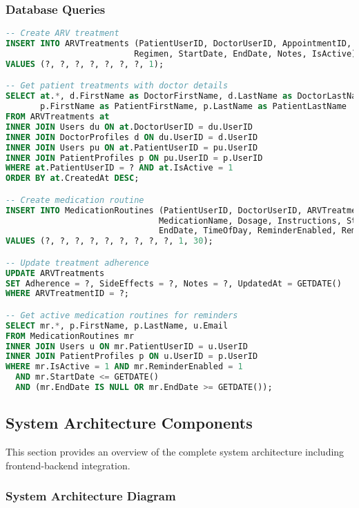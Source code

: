 \documentclass[12pt,a4paper]{article}
\begin{document}
\subsubsection{Database Queries}

\begin{lstlisting}[language=SQL, caption=ARV Treatment Management Queries]
-- Create ARV treatment
INSERT INTO ARVTreatments (PatientUserID, DoctorUserID, AppointmentID, 
                          Regimen, StartDate, EndDate, Notes, IsActive)
VALUES (?, ?, ?, ?, ?, ?, ?, 1);

-- Get patient treatments with doctor details
SELECT at.*, d.FirstName as DoctorFirstName, d.LastName as DoctorLastName,
       p.FirstName as PatientFirstName, p.LastName as PatientLastName
FROM ARVTreatments at
INNER JOIN Users du ON at.DoctorUserID = du.UserID
INNER JOIN DoctorProfiles d ON du.UserID = d.UserID
INNER JOIN Users pu ON at.PatientUserID = pu.UserID
INNER JOIN PatientProfiles p ON pu.UserID = p.UserID
WHERE at.PatientUserID = ? AND at.IsActive = 1
ORDER BY at.CreatedAt DESC;

-- Create medication routine
INSERT INTO MedicationRoutines (PatientUserID, DoctorUserID, ARVTreatmentID,
                               MedicationName, Dosage, Instructions, StartDate, 
                               EndDate, TimeOfDay, ReminderEnabled, ReminderMinutesBefore)
VALUES (?, ?, ?, ?, ?, ?, ?, ?, ?, 1, 30);

-- Update treatment adherence
UPDATE ARVTreatments 
SET Adherence = ?, SideEffects = ?, Notes = ?, UpdatedAt = GETDATE()
WHERE ARVTreatmentID = ?;

-- Get active medication routines for reminders
SELECT mr.*, p.FirstName, p.LastName, u.Email
FROM MedicationRoutines mr
INNER JOIN Users u ON mr.PatientUserID = u.UserID
INNER JOIN PatientProfiles p ON u.UserID = p.UserID
WHERE mr.IsActive = 1 AND mr.ReminderEnabled = 1
  AND mr.StartDate <= GETDATE() 
  AND (mr.EndDate IS NULL OR mr.EndDate >= GETDATE());
\end{lstlisting}

\subsection{System Architecture Components}

This section provides an overview of the complete system architecture including frontend-backend integration.

\subsubsection{System Architecture Diagram}
\end{document}

